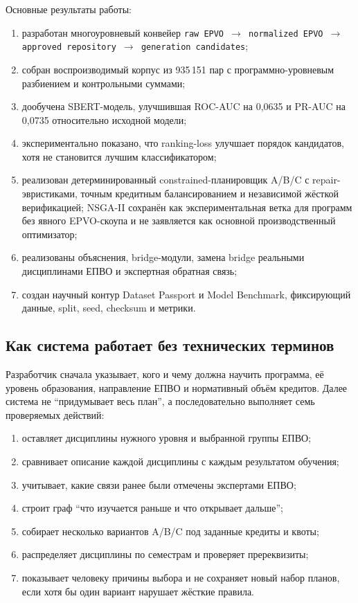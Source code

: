 \documentclass[twoside,11pt]{article}
\begin{document}
Основные результаты работы:
\begin{enumerate}
  \item разработан многоуровневый конвейер \texttt{raw EPVO $\rightarrow$ normalized EPVO $\rightarrow$ approved repository $\rightarrow$ generation candidates};
  \item собран воспроизводимый корпус из 935\,151 пар с программно-уровневым разбиением и контрольными суммами;
  \item дообучена SBERT-модель, улучшившая ROC-AUC на 0,0635 и PR-AUC на 0,0735 относительно исходной модели;
  \item экспериментально показано, что ranking-loss улучшает порядок кандидатов, хотя не становится лучшим классификатором;
  \item реализован детерминированный constrained-планировщик A/B/C с repair-эвристиками, точным кредитным балансированием и независимой жёсткой верификацией; NSGA-II сохранён как экспериментальная ветка для программ без явного EPVO-скоупа и не заявляется как основной производственный оптимизатор;
  \item реализованы объяснения, bridge-модули, замена bridge реальными дисциплинами ЕПВО и экспертная обратная связь;
  \item создан научный контур Dataset Passport и Model Benchmark, фиксирующий данные, split, seed, checksum и метрики.
\end{enumerate}

\subsection*{Как система работает без технических терминов}

Разработчик сначала указывает, кого и чему должна научить программа, её уровень
образования, направление ЕПВО и нормативный объём кредитов. Далее система не
``придумывает весь план'', а последовательно выполняет семь проверяемых действий:
\begin{enumerate}
  \item оставляет дисциплины нужного уровня и выбранной группы ЕПВО;
  \item сравнивает описание каждой дисциплины с каждым результатом обучения;
  \item учитывает, какие связи ранее были отмечены экспертами ЕПВО;
  \item строит граф ``что изучается раньше и что открывает дальше'';
  \item собирает несколько вариантов A/B/C под заданные кредиты и квоты;
  \item распределяет дисциплины по семестрам и проверяет пререквизиты;
  \item показывает человеку причины выбора и не сохраняет новый набор планов,
        если хотя бы один вариант нарушает жёсткие правила.
\end{enumerate}
\end{document}
